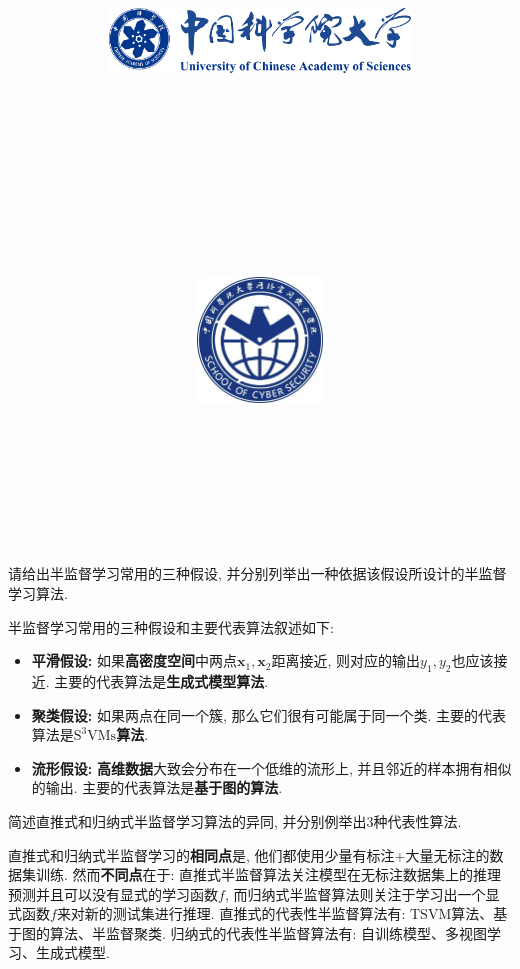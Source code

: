 \documentclass{article}
\title{
	\includegraphics[width=0.6\textwidth]{images/title/ucas_logo 1.pdf}\\
    \vspace{1in}
    \textmd{\textbf{\hmwkClass}}\\
	\textmd{\Large{\textbf{\hmwkClassID}}}\\
    \textmd{\textbf{\hmwkTitle}}\\
    \normalsize\vspace{0.1in}\large{\hmwkCompleteTime }\\
    \vspace{0.1in}\large{\textit{\hmwkClassInstructor\ }}\\
    \vspace{1in}
	\includegraphics[width=0.25\textwidth]{images/title/Cyber.jpg}\\
	\vspace{1in}
}
\author{
	\hmwkAuthorName \\ 
	\hmwkAuthorStuID \\
	\hmwkAuthorInst \\
	\hmwkAuthorzhuanye \\
	\hmwkAuthorfangxiang
	}
\date{}
\begin{document}
\maketitle


%
%
%
%
%

\begin{homeworkProblem}
	请给出半监督学习常用的三种假设, 并分别列举出一种依据该假设所设计的半监督学习算法.

	\solution 半监督学习常用的三种假设和主要代表算法叙述如下:
	\begin{itemize}
		\item \textbf{平滑假设:} 如果\textbf{高密度空间}中两点$\boldsymbol{x}_1,\boldsymbol{x}_2$距离接近, 则对应的输出$y_1,y_2$也应该接近. 主要的代表算法是\textbf{生成式模型算法}.
		\item \textbf{聚类假设:} 如果两点在同一个簇, 那么它们很有可能属于同一个类. 主要的代表算法是\textbf{$\text{S}^3\text{VMs}$算法}.
		\item \textbf{流形假设:} \textbf{高维数据}大致会分布在一个低维的流形上, 并且邻近的样本拥有相似的输出. 主要的代表算法是\textbf{基于图的算法}.
	\end{itemize}
\end{homeworkProblem}

\begin{homeworkProblem}
	简述直推式和归纳式半监督学习算法的异同, 并分别例举出3种代表性算法.

	\solution 直推式和归纳式半监督学习的\textbf{相同点}是, 他们都使用少量有标注+大量无标注的数据集训练. 然而\textbf{不同点}在于: 直推式半监督算法关注模型在无标注数据集上的推理预测并且可以没有显式的学习函数$f$, 而归纳式半监督算法则关注于学习出一个显式函数$f$来对新的测试集进行推理. 直推式的代表性半监督算法有: $\text{TSVM}$算法、基于图的算法、半监督聚类. 归纳式的代表性半监督算法有: 自训练模型、多视图学习、生成式模型.
\end{homeworkProblem}


%
\end{document}

